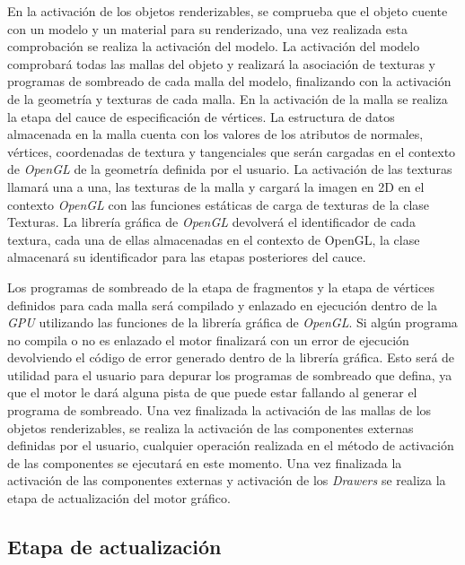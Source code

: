 \documentclass[a4paper]{book}
\begin{document}
En la activación de los objetos renderizables, se comprueba que el objeto cuente con un modelo y un material para su renderizado,
una vez realizada esta comprobación se realiza la activación del modelo. La activación del modelo comprobará todas las mallas del
objeto y realizará la asociación de texturas y programas de sombreado de cada malla del modelo, finalizando con la activación de la
geometría y texturas de cada malla. En la activación de la malla se realiza la etapa del cauce de especificación de vértices. La
estructura de datos almacenada en la malla cuenta con los valores de los atributos de normales, vértices, coordenadas de textura y
tangenciales que serán cargadas en el contexto de \textit{OpenGL} de la geometría definida por el usuario. La activación de las texturas
llamará una a una, las texturas de la malla y cargará la imagen en 2D en el contexto \textit{OpenGL} con las funciones estáticas de carga
de texturas de la clase Texturas. La librería gráfica de \textit{OpenGL} devolverá el identificador de cada textura, cada una de ellas
almacenadas en el contexto de OpenGL, la clase almacenará su identificador para las etapas posteriores del cauce.

Los programas de sombreado de la etapa de fragmentos y la etapa de vértices definidos para cada malla será compilado y enlazado en
ejecución dentro de la \textit{GPU} utilizando las funciones de la librería gráfica de \textit{OpenGL}. Si algún programa no compila o
no es enlazado el motor finalizará con un error de ejecución devolviendo el código de error generado dentro de la librería gráfica. Esto será de
utilidad para el usuario para depurar los programas de sombreado que defina, ya que el motor le dará alguna pista de que puede estar
fallando al generar el programa de sombreado. Una vez finalizada la activación de las mallas de los objetos renderizables, se realiza la
activación de las componentes externas definidas por el usuario, cualquier operación realizada en el método de activación de las
componentes se ejecutará en este momento. Una vez finalizada la activación de las componentes externas y activación de los \textit{Drawers}
se realiza la etapa de actualización del motor gráfico.

\subsection{Etapa de actualización}
\label{subsec:actualizacion}
\end{document}
